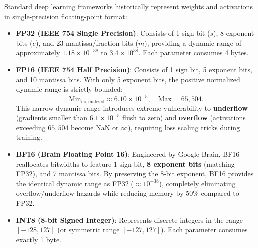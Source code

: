 \documentclass[../../../main.tex]{subfiles}
\begin{document}
Standard deep learning frameworks historically represent weights and activations in single-precision floating-point format:
\begin{itemize}
    \item \textbf{FP32 (IEEE 754 Single Precision)}: Consists of 1 sign bit ($s$), 8 exponent bits ($e$), and 23 mantissa/fraction bits ($m$), providing a dynamic range of approximately $1.18 \times 10^{-38}$ to $3.4 \times 10^{38}$. Each parameter consumes 4 bytes.
    \item \textbf{FP16 (IEEE 754 Half Precision)}: Consists of 1 sign bit, 5 exponent bits, and 10 mantissa bits. With only 5 exponent bits, the positive normalized dynamic range is strictly bounded:
    \begin{equation}
    \text{Min}_{\text{normalized}} \approx 6.10 \times 10^{-5}, \quad \text{Max} = 65{,}504.
    \end{equation}
    This narrow dynamic range introduces extreme vulnerability to \textbf{underflow} (gradients smaller than $6.1 \times 10^{-5}$ flush to zero) and \textbf{overflow} (activations exceeding $65{,}504$ become $\text{NaN}$ or $\infty$), requiring loss scaling tricks during training.
    \item \textbf{BF16 (Brain Floating Point 16)}: Engineered by Google Brain, BF16 reallocates bitwidths to feature 1 sign bit, \textbf{8 exponent bits} (matching FP32), and 7 mantissa bits. By preserving the 8-bit exponent, BF16 provides the identical dynamic range as FP32 ($\approx 10^{\pm 38}$), completely eliminating overflow/underflow hazards while reducing memory by $50\%$ compared to FP32.
    \item \textbf{INT8 (8-bit Signed Integer)}: Represents discrete integers in the range $[-128, 127]$ (or symmetric range $[-127, 127]$). Each parameter consumes exactly 1 byte.
\end{itemize}
\end{document}
